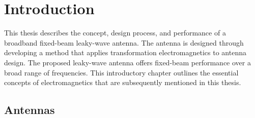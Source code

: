 

\chapter{Introduction} %
\label{Chapter0}

This thesis describes the concept, design process, and performance of a broadband fixed-beam leaky-wave antenna. The antenna is designed through developing a method that applies transformation electromagnetics to antenna design. The proposed leaky-wave antenna offers fixed-beam performance over a broad range of frequencies. This introductory chapter outlines the essential concepts of electromagnetics that are subsequently mentioned in this thesis. %


\section{Antennas}

